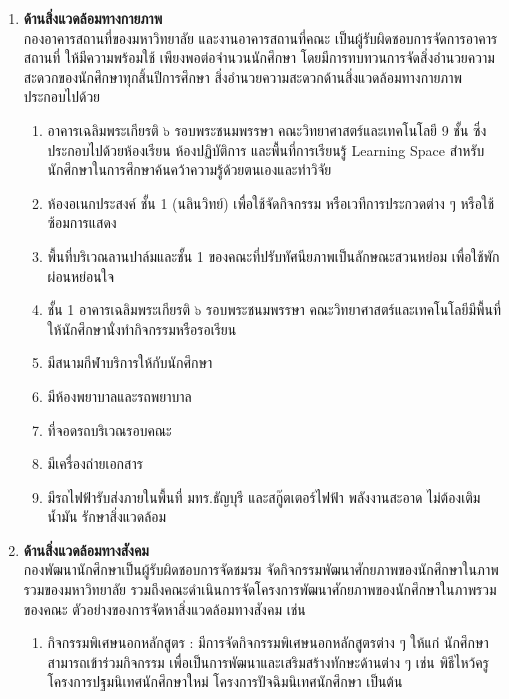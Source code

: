 \begin{enumerate}
\item {\bf ด้านสิ่งแวดล้อมทางกายภาพ}\\ 
กองอาคารสถานที่ของมหาวิทยาลัย และงานอาคารสถานที่คณะ เป็นผู้รับผิดชอบการจัดการอาคารสถานที่ ให้มีความพร้อมใช้ เพียงพอต่อจำนวนนักศึกษา โดยมีการทบทวนการจัดสิ่งอำนวยความสะดวกของนักศึกษาทุกสิ้นปีการศึกษา สิ่งอำนวยความสะดวกด้านสิ่งแวดล้อมทางกายภาพประกอบไปด้วย
\begin{enumerate}[label=\arabic*), leftmargin=1.2cm]
\item อาคารเฉลิมพระเกียรติ ๖ รอบพระชนมพรรษา คณะวิทยาศาสตร์และเทคโนโลยี 9 ชั้น  ซึ่งประกอบไปด้วยห้องเรียน ห้องปฏิบัติการ และพื้นที่การเรียนรู้ Learning Space สำหรับนักศึกษาในการศึกษาค้นคว้าความรู้ด้วยตนเองและทำวิจัย 
\item ห้องอเนกประสงค์ ชั้น 1 (นลินวิทย์) เพื่อใช้จัดกิจกรรม หรือเวทีการประกวดต่าง ๆ หรือใช้ซ้อมการแสดง 
\item พื้นที่บริเวณลานปาล์มและชั้น 1 ของคณะที่ปรับทัศนียภาพเป็นลักษณะสวนหย่อม เพื่อใช้พักผ่อนหย่อนใจ 
\item ชั้น 1 อาคารเฉลิมพระเกียรติ ๖ รอบพระชนมพรรษา คณะวิทยาศาสตร์และเทคโนโลยีมีพื้นที่ให้นักศึกษานั่งทำกิจกรรมหรือรอเรียน
\item มีสนามกีฬาบริการให้กับนักศึกษา
\item มีห้องพยาบาลและรถพยาบาล 
\item ที่จอดรถบริเวณรอบคณะ
\item มีเครื่องถ่ายเอกสาร 
\item มีรถไฟฟ้ารับส่งภายในพื้นที่ มทร.ธัญบุรี และสกู๊ตเตอร์ไฟฟ้า พลังงานสะอาด ไม่ต้องเติมน้ำมัน
 รักษาสิ่งแวดล้อม
\end{enumerate}
\item {\bf ด้านสิ่งแวดล้อมทางสังคม}\\ 
กองพัฒนานักศึกษาเป็นผู้รับผิดชอบการจัดชมรม จัดกิจกรรมพัฒนาศักยภาพของนักศึกษาในภาพรวมของมหาวิทยาลัย รวมถึงคณะดำเนินการจัดโครงการพัฒนาศักยภาพของนักศึกษาในภาพรวมของคณะ ตัวอย่างของการจัดหาสิ่งแวดล้อมทางสังคม เช่น 
\begin{enumerate}[label=\arabic*), leftmargin=1.2cm]
\item กิจกรรมพิเศษนอกหลักสูตร :  มีการจัดกิจกรรมพิเศษนอกหลักสูตรต่าง ๆ ให้แก่ นักศึกษาสามารถเข้าร่วมกิจกรรม เพื่อเป็นการพัฒนาและเสริมสร้างทักษะด้านต่าง ๆ เช่น พิธีไหว้ครู โครงการปฐมนิเทศนักศึกษาใหม่ โครงการปัจฉิมนิเทศนักศึกษา เป็นต้น

\end{enumerate}
\end{enumerate}
